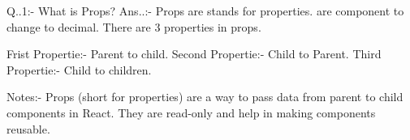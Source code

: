Q..1:- What is Props?
Ans..:- Props are stands for properties. are component to change to decimal.
        There are 3 properties in props.
        
        Frist Propertie:- Parent to child.
        Second Propertie:- Child to Parent.
        Third Propertie:- Child to children.
        
Notes:- Props (short for properties) are a way to pass data from parent to child components in React. They are read-only and help in making components reusable.